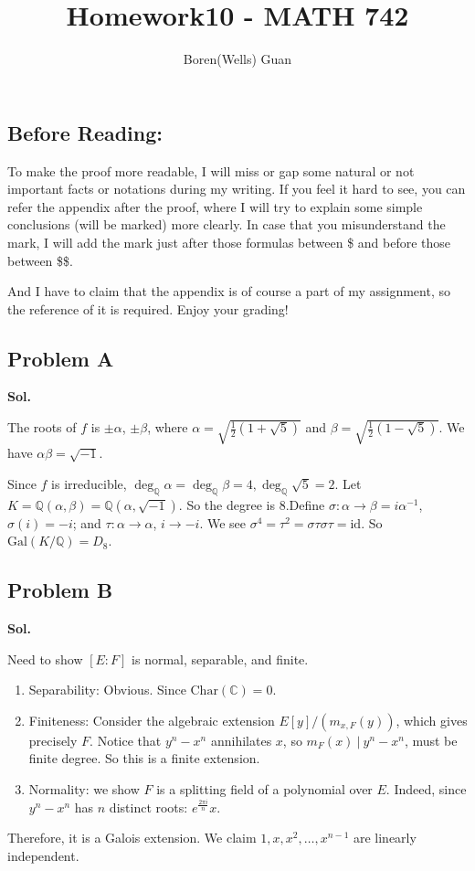 \documentclass[lang=en,11pt,a4paper,citestyle =authoryear]{elegantpaper}
\title{Homework10 - MATH 742}
\author{Boren(Wells) Guan}
\newcommand{\Q}{\mathbb{Q}}
\begin{document}
\maketitle

\subsection*{Before Reading:}\par
To make the proof more readable, I will miss or gap some natural or not important facts or notations during my writing. If you feel it hard to see, you can refer the appendix after the proof, where I will try to explain some simple conclusions (will be marked) more clearly. In case that you misunderstand the mark, I will add the mark just after those formulas between \$ and before those between \$\$.\par
And I have to claim that the appendix is of course a part of my assignment, so the reference of it is required. Enjoy your grading!

\subsection*{Problem A}
\vspace{0.5em}
\textbf{Sol.} \par
    The roots of $f$ is $\pm \alpha$, $\pm\beta$, where $\alpha=\sqrt{\frac{1}{2}(1+\sqrt{5})}$ and $\beta=\sqrt{\frac{1}{2}(1-\sqrt{5})}$. We have $\alpha\beta=\sqrt{-1}.$ 

Since $f$ is irreducible, $\deg_\Q\alpha=\deg_{\Q}\beta=4, \deg_\Q\sqrt{5}=2$. Let $K=\Q(\alpha,\beta)=\Q(\alpha,\sqrt{-1})$. So the degree is $8$.Define $\sigma: \alpha\rightarrow \beta=i\alpha^{-1}$, $\sigma(i)=-i$; and $\tau: \alpha\rightarrow\alpha$, $i\rightarrow -i$. 
We see $\sigma^4=\tau^2=\sigma\tau\sigma\tau=\text{id}$. So $\text{Gal}(K/\mathbb Q)=D_8$.

\par 


\subsection*{Problem B}
\textbf{Sol.} \par
Need to show $[E:F]$ is normal, separable, and finite. 

\begin{enumerate}
    \item Separability: Obvious. Since $\text{Char}(\mathbb C)=0$.
    \item Finiteness: Consider the algebraic extension $E[y]/(m_{x,F}(y))$, which gives precisely $F$. Notice that $y^n-x^n$ annihilates $x$, so $m_F(x)\ |\ y^n-x^n$, must be finite degree. So this is a finite extension.
    \item Normality: we show $F$ is a splitting field of a polynomial over $E$. Indeed, since $y^n-x^n$ has $n$ distinct roots: $e^{\frac{2\pi i}{n}}x$.
\end{enumerate}
Therefore, it is a Galois extension. We claim $1,x,x^2,\dots,x^{n-1}$ are linearly independent. 
\end{document}
